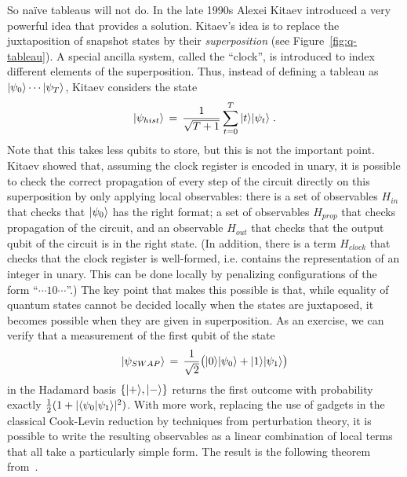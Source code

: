 So na\"ive tableaus will not do. In the late 1990s Alexei Kitaev introduced a very powerful idea that provides a solution. Kitaev's idea is to replace the juxtaposition of snapshot states by their \emph{superposition} (see Figure~\ref{fig:q-tableau}). A special ancilla system, called the ``clock'', is introduced to index different elements of the superposition. Thus, instead of defining a tableau as $|\psi_0\rangle \cdots |\psi_T\rangle$, Kitaev considers the state
\begin{equation}\label{eq:h-state}
 |\psi_{hist}\rangle\,=\,\frac{1}{\sqrt{T+1}} \sum_{t=0}^T |t\rangle|\psi_t\rangle\;.
\end{equation}
Note that this takes less qubits to store, but this is not the important point. 
 Kitaev showed that, assuming the clock register is encoded in unary, it is possible to check the correct propagation of every step of the circuit directly on this superposition by only applying local observables: there is a set of observables $H_{in}$ that checks that $|\psi_0\rangle$ has the right format; a set of observables $H_{prop}$ that checks propagation of the circuit, and an observable $H_{out}$ that checks that the output qubit of the circuit is in the right state. (In addition, there is a term $H_{clock}$ that checks that the clock register is well-formed, i.e. contains the representation of an integer in unary. This can be done locally by penalizing configurations of the form ``$\cdots 10\cdots$''.) The key point that makes this possible is that, while equality of quantum states cannot be decided locally when the states are juxtaposed, it becomes possible when they are given in superposition. As an exercise, we can verify that a measurement of the first qubit of the state
\[ |\psi_{SWAP}\rangle \,=\, \frac{1}{\sqrt{2}}\big( |0\rangle |\psi_0\rangle + |1\rangle|\psi_1\rangle\big)\]
in the Hadamard basis $\{ |+\rangle,|-\rangle\}$ returns the first outcome with probability exactly $\frac{1}{2}(1+|\langle\psi_0|\psi_1\rangle|^2)$. 
With more work, replacing the use of gadgets in the classical Cook-Levin reduction by techniques from perturbation theory, it is possible to write the resulting observables as a linear combination of local terms that all take a particularly simple form. 
The result is the following theorem from~\cite{cubitt2016complexity}.

